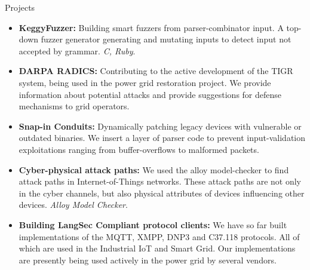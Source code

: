 \documentclass[]{mcdowellcv}
\begin{document}
	\begin{cvsection}{Projects}
		\begin{cvsubsection}{}{}{}
			\begin{itemize}
                \item \textbf{KeggyFuzzer: }Building smart fuzzers from parser-combinator input. A top-down fuzzer generator generating and mutating inputs to detect input not accepted by grammar. \textit{C, Ruby}.
                \item \textbf{DARPA RADICS:} Contributing to the active development of the TIGR system, being used in the power grid restoration project. We provide information about potential attacks and provide suggestions for defense mechanisms to grid operators.
			    \item \textbf{Snap-in Conduits: } Dynamically patching legacy devices with vulnerable or outdated binaries. We insert a layer of parser code to prevent input-validation exploitations ranging from buffer-overflows to malformed packets.
				\item \textbf{Cyber-physical attack paths:} We used the alloy model-checker to find attack paths in Internet-of-Things networks. These attack paths are not only in the cyber channels, but also physical attributes of devices influencing other devices. \textit{Alloy Model Checker}.
				\item \textbf{Building LangSec Compliant protocol clients:} We have so far built implementations of the MQTT, XMPP, DNP3 and C37.118 protocols. All of which are used in the Industrial IoT and Smart Grid. Our implementations are presently being used actively in the power grid by several vendors.



			\end{itemize}
		\end{cvsubsection}
	\end{cvsection}
\end{document}
